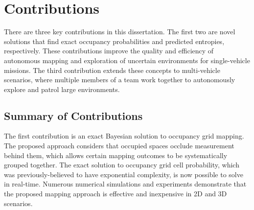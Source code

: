 \section{Contributions}

There are three key contributions in this dissertation. The first two are novel solutions that find exact occupancy probabilities and predicted entropies, respectively. These contributions improve the quality and efficiency of autonomous mapping and exploration of uncertain environments for single-vehicle missions. The third contribution extends these concepts to multi-vehicle scenarios, where multiple members of a team work together to autonomously explore and patrol large environments.




\subsection{Summary of Contributions}

The first contribution is an exact Bayesian solution to occupancy grid mapping. The proposed approach considers that occupied spaces occlude measurement behind them, which allows certain mapping outcomes to be systematically grouped together. The exact solution to occupancy grid cell probability, which was previously-believed to have exponential complexity, is now possible to solve in real-time. Numerous numerical simulations and experiments demonstrate that the proposed mapping approach is effective and inexpensive in 2D and 3D scenarios.



